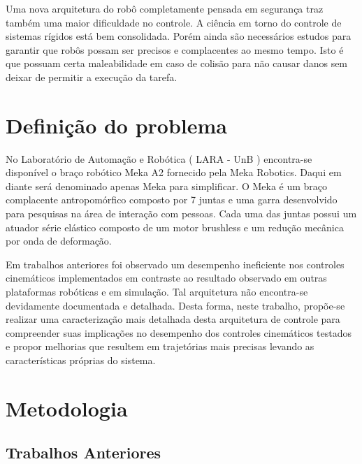 Uma nova arquitetura do robô completamente pensada em segurança traz também uma maior dificuldade no controle. A ciência em torno do controle de sistemas rígidos está bem consolidada. Porém ainda são necessários estudos para garantir que robôs possam ser precisos e complacentes ao mesmo tempo. Isto é que possuam certa maleabilidade em caso de colisão para não causar danos sem deixar de permitir a execução da tarefa.



\section{Definição do problema}

No Laboratório de Automação e Robótica ( LARA - UnB ) encontra-se disponível o braço robótico Meka A2 fornecido pela Meka Robotics. Daqui em diante será denominado apenas Meka para simplificar. O Meka é um braço complacente antropomórfico composto por 7 juntas e uma garra desenvolvido para pesquisas na área de interação com pessoas. Cada uma das juntas possui um atuador série elástico composto de um motor brushless e um redução mecânica por onda de deformação.

Em trabalhos anteriores foi observado um desempenho ineficiente nos controles cinemáticos implementados em contraste ao resultado observado em outras plataformas robóticas e em simulação. Tal arquitetura não encontra-se devidamente documentada e detalhada. Desta forma, neste trabalho, propõe-se realizar uma caracterização mais detalhada desta arquitetura de controle para compreender suas implicações no desempenho dos controles cinemáticos testados e propor melhorias que resultem em trajetórias mais precisas levando as características próprias do sistema.

\section{Metodologia}

\subsection{Trabalhos Anteriores}

